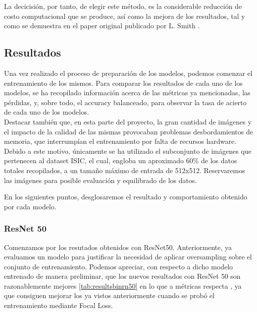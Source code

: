 La decicisión, por tanto, de elegir este método, es la considerable reducción de costo computacional que se produce, así como la mejora de los resultados, tal y como se demuestra en el paper original publicado por L. Smith \cite{smith2018disciplined}. 

\subsection{Resultados}

Una vez realizado el proceso de preparación de los modelos, podemos comenzar el entrenamiento de los mismos. Para comparar los resultados de cada uno de los modelos, se ha recopilado información acerca de las métricas ya mencionadas, las pérdidas, y, sobre todo, el accuracy balanceado, para observar la tasa de acierto de cada uno de los modelos.\\

Destacar también que, en esta parte del proyecto, la gran cantidad de imágenes y el impacto de la calidad de las mismas provocaban problemas desbordamientos de memoria, que interrumpían el entrenamiento por falta de recursos hardware. Debido a este motivo, únicamente se ha utilizado el subconjunto de imágenes que pertenecen al dataset ISIC, el cual, engloba un aproximado 60\% de los datos totales recopilados, a un tamaño máximo de entrada de 512x512. Reservaremos las imágenes para posible evaluación y equilibrado de los datos.

En los siguientes puntos, desglosaremos el resultado y comportamiento obtenido por cada modelo.

\subsubsection{ResNet 50}

Comenzamos por los resutados obtenidos con ResNet50. Anteriormente, ya evaluamos un modelo para justificar la necesidad de aplicar oversampling sobre el conjunto de entrenamiento. Podemos apreciar, con respecto a dicho modelo entrenado de manera preliminar, que los nuevos resultados con ResNet 50 son razonablemente mejores \ref{tab:resultsbinrn50} en lo que a métricas respecta , ya que consiguen mejorar los ya vistos anteriormente cuando se probó el entrenamiento mediante Focal Loss.

